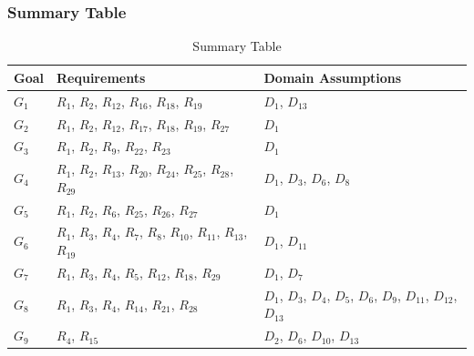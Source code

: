\subsubsection{Summary Table}
\begin{table}[H]
    \begin{tabular}{|p{1cm}|p{7cm}|p{7cm}|}
        \hline
        \textbf{Goal} & \textbf{Requirements} & \textbf{Domain Assumptions} \\ \hline
        $G_{1}$ & $R_{1}$, $R_{2}$, $R_{12}$, $R_{16}$, $R_{18}$, $R_{19}$ & $D_{1}$, $D_{13}$\\ \hline
        $G_{2}$ & $R_{1}$, $R_{2}$, $R_{12}$, $R_{17}$, $R_{18}$, $R_{19}$, $R_{27}$ & $D_{1}$\\ \hline
        $G_{3}$ & $R_{1}$, $R_{2}$, $R_{9}$, $R_{22}$, $R_{23}$ & $D_{1}$\\ \hline
        $G_{4}$ & $R_{1}$, $R_{2}$, $R_{13}$, $R_{20}$, $R_{24}$, $R_{25}$, $R_{28}$, $R_{29}$ & $D_{1}$, $D_{3}$, $D_{6}$, $D_{8}$\\ \hline
        $G_{5}$ & $R_{1}$, $R_{2}$, $R_{6}$, $R_{25}$, $R_{26}$, $R_{27}$ & $D_{1}$\\ \hline
        $G_{6}$ & $R_{1}$, $R_{3}$, $R_{4}$, $R_{7}$, $R_{8}$, $R_{10}$, $R_{11}$, $R_{13}$, $R_{19}$ & $D_{1}$, $D_{11}$\\ \hline
        $G_{7}$ & $R_{1}$, $R_{3}$, $R_{4}$, $R_{5}$, $R_{12}$, $R_{18}$, $R_{29}$ & $D_{1}$, $D_{7}$\\ \hline
        $G_{8}$ & $R_{1}$, $R_{3}$, $R_{4}$, $R_{14}$, $R_{21}$, $R_{28}$ & $D_{1}$, $D_{3}$, $D_{4}$, $D_{5}$, $D_{6}$, $D_{9}$, $D_{11}$, $D_{12}$, $D_{13}$\\ \hline
        $G_{9}$ & $R_{4}$, $R_{15}$ & $D_{2}$, $D_{6}$, $D_{10}$, $D_{13}$\\ \hline
    \end{tabular}
    \caption{Summary Table}
\end{table}

